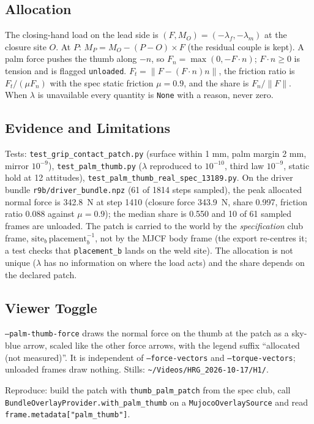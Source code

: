 \documentclass[11pt,a4paper]{article}
\begin{document}
\subsection{Allocation}
The closing-hand load on the lead side is $(F,M_O)=(-\lambda_f,-\lambda_m)$ at
the closure site $O$. At $P$: $M_P=M_O-(P-O)\times F$ (the residual couple is
kept). A palm force pushes the thumb along $-n$, so
$F_n=\max(0,-F\cdot n)$; $F\cdot n\ge 0$ is tension and is flagged
\texttt{unloaded}. $F_t=\lVert F-(F\cdot n)n\rVert$, the friction ratio is
$F_t/(\mu F_n)$ with the spec static friction $\mu=0.9$, and the share is
$F_n/\lVert F\rVert$. When $\lambda$ is unavailable every quantity is
\texttt{None} with a reason, never zero.

\subsection{Evidence and Limitations}
Tests: \texttt{test\_grip\_contact\_patch.py} (surface within 1 mm, palm
margin 2 mm, mirror $10^{-9}$), \texttt{test\_palm\_thumb.py} ($\lambda$
reproduced to $10^{-10}$, third law $10^{-9}$, static hold at 12 attitudes),
\texttt{test\_palm\_thumb\_real\_spec\_13189.py}. On the driver bundle
\texttt{r9b/driver\_bundle.npz} (61 of 1814 steps sampled), the peak allocated
normal force is 342.8~N at step 1410 (closure force 343.9~N, share 0.997,
friction ratio 0.088 against $\mu=0.9$); the median share is 0.550 and 10 of 61
sampled frames are unloaded. The patch is carried to the world by the
\emph{specification} club frame, $\mathrm{site}_b\,\mathrm{placement}_b^{-1}$,
not by the MJCF body frame (the export re-centres it; a test checks that
\texttt{placement\_b} lands on the weld site). The allocation is not unique
($\lambda$ has no information on where the load acts) and the share depends on
the declared patch.

\subsection{Viewer Toggle}
\texttt{--palm-thumb-force} draws the normal force on the thumb at the patch as
a sky-blue arrow, scaled like the other force arrows, with the legend suffix
``allocated (not measured)''. It is independent of
\texttt{--force-vectors} and \texttt{--torque-vectors}; unloaded frames draw
nothing. Stills: \texttt{\~{}/Videos/HRG\_2026-10-17/H1/}.

Reproduce: build the patch with \texttt{thumb\_palm\_patch} from the spec club,
call \texttt{BundleOverlayProvider.with\_palm\_thumb} on a
\texttt{MujocoOverlaySource} and read \texttt{frame.metadata["palm\_thumb"]}.
\end{document}
